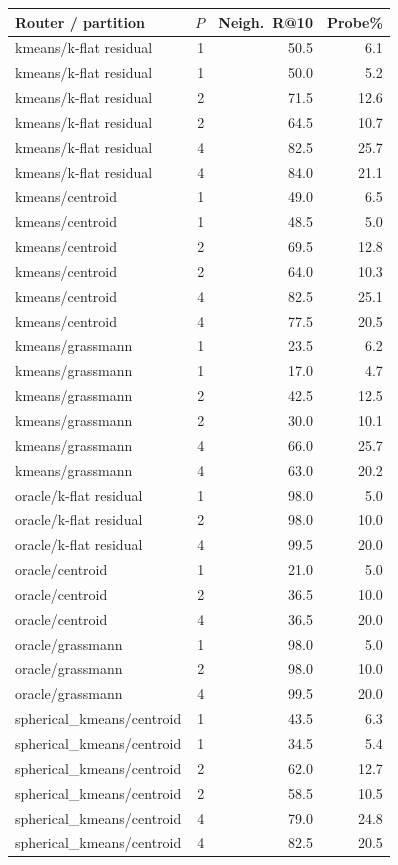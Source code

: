 \begin{tabular}{lrrr}
\toprule
Router / partition & $P$ & Neigh.\ R@10 & Probe\% \\
\midrule
kmeans/k-flat residual & 1 & 50.5 & 6.1 \\
kmeans/k-flat residual & 1 & 50.0 & 5.2 \\
kmeans/k-flat residual & 2 & 71.5 & 12.6 \\
kmeans/k-flat residual & 2 & 64.5 & 10.7 \\
kmeans/k-flat residual & 4 & 82.5 & 25.7 \\
kmeans/k-flat residual & 4 & 84.0 & 21.1 \\
kmeans/centroid & 1 & 49.0 & 6.5 \\
kmeans/centroid & 1 & 48.5 & 5.0 \\
kmeans/centroid & 2 & 69.5 & 12.8 \\
kmeans/centroid & 2 & 64.0 & 10.3 \\
kmeans/centroid & 4 & 82.5 & 25.1 \\
kmeans/centroid & 4 & 77.5 & 20.5 \\
kmeans/grassmann & 1 & 23.5 & 6.2 \\
kmeans/grassmann & 1 & 17.0 & 4.7 \\
kmeans/grassmann & 2 & 42.5 & 12.5 \\
kmeans/grassmann & 2 & 30.0 & 10.1 \\
kmeans/grassmann & 4 & 66.0 & 25.7 \\
kmeans/grassmann & 4 & 63.0 & 20.2 \\
oracle/k-flat residual & 1 & 98.0 & 5.0 \\
oracle/k-flat residual & 2 & 98.0 & 10.0 \\
oracle/k-flat residual & 4 & 99.5 & 20.0 \\
oracle/centroid & 1 & 21.0 & 5.0 \\
oracle/centroid & 2 & 36.5 & 10.0 \\
oracle/centroid & 4 & 36.5 & 20.0 \\
oracle/grassmann & 1 & 98.0 & 5.0 \\
oracle/grassmann & 2 & 98.0 & 10.0 \\
oracle/grassmann & 4 & 99.5 & 20.0 \\
spherical_kmeans/centroid & 1 & 43.5 & 6.3 \\
spherical_kmeans/centroid & 1 & 34.5 & 5.4 \\
spherical_kmeans/centroid & 2 & 62.0 & 12.7 \\
spherical_kmeans/centroid & 2 & 58.5 & 10.5 \\
spherical_kmeans/centroid & 4 & 79.0 & 24.8 \\
spherical_kmeans/centroid & 4 & 82.5 & 20.5 \\
\bottomrule
\end{tabular}
